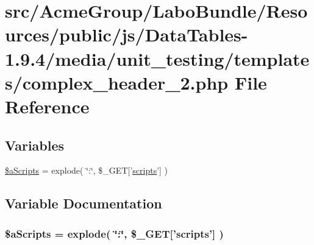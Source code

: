 \hypertarget{complex__header__2_8php}{\section{src/\+Acme\+Group/\+Labo\+Bundle/\+Resources/public/js/\+Data\+Tables-\/1.9.4/media/unit\+\_\+testing/templates/complex\+\_\+header\+\_\+2.php File Reference}
\label{complex__header__2_8php}
}
\subsection*{Variables}
\begin{DoxyCompactItemize}
\item 
\hyperlink{complex__header__2_8php_a3e8e1608000c9afdd05327fc2b06b056}{\$a\+Scripts} = explode( \char`\"{}\+:\char`\"{}, \$\+\_\+\+G\+E\+T\mbox{[}'\hyperlink{tinymce_8jquery_8dev_8js_a09066d4d580eeec222f858d588b4cdef}{scripts}'\mbox{]} )
\end{DoxyCompactItemize}


\subsection{Variable Documentation}
\hypertarget{complex__header__2_8php_a3e8e1608000c9afdd05327fc2b06b056}{
\subsubsection[{\$a\+Scripts}]{\setlength{\rightskip}{0pt plus 5cm}\$a\+Scripts = explode( \char`\"{}\+:\char`\"{}, \$\+\_\+\+G\+E\+T\mbox{[}'{\bf scripts}'\mbox{]} )}}\label{complex__header__2_8php_a3e8e1608000c9afdd05327fc2b06b056}
